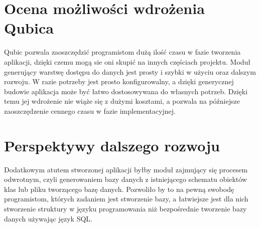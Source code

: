 \documentclass[12pt]{report}
\begin{document}
\section{Ocena możliwości wdrożenia Qubica}
Qubic pozwala zaoszczędzić programistom dużą ilość czasu w fazie tworzenia aplikacji, dzięki czemu mogą sie oni skupić na innych częściach projektu. Moduł generujący warstwę dostępu do danych jest prosty i szybki w użyciu oraz dalszym rozwoju. W razie potrzeby jest prosto konfigurowalny, a dzięki generycznej budowie aplikacja może być łatwo dostosowywana do własnych potrzeb. Dzięki temu jej wdrożenie nie wiąże się z dużymi kosztami, a pozwala na późniejsze zaoszczędzenie cennego czasu w fazie implementacyjnej.
\section{Perspektywy dalszego rozwoju}
Dodatkowym atutem stworzonej aplikacji byłby moduł zajmujący się procesem odwrotnym, czyli generowaniem bazy danych z istniejącego schematu obiektów klas lub pliku tworzącego bazę danych. Pozwoliło by to na pewną swobodę programistom, których zadaniem jest stworzenie bazy, a łatwiejsze jest dla nich stworzenie struktury w języku programowania niż bezpośrednie tworzenie bazy danych używając język SQL.
\end{document}
